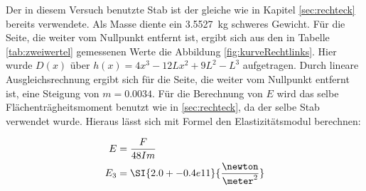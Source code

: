 Der in diesem Versuch benutzte Stab ist der gleiche wie in Kapitel \ref{sec:rechteck} bereits verwendete.
Als Masse diente ein \SI{3.5527}{\kilo\gram} schweres Gewicht. Für die Seite, die weiter vom Nullpunkt entfernt ist, ergibt
sich aus den in Tabelle \ref{tab:zweiwertel} gemessenen Werte
die Abbildung \ref{fig:kurveRechtlinks}. Hier wurde $D(x)$ über $h(x)=4x^3-12Lx^2+9L^2-L^3$ aufgetragen.
Durch lineare Ausgleichsrechnung ergibt sich für die Seite, die weiter vom Nullpunkt entfernt ist, eine Steigung von $m=\num{0.0034}$.
Für die Berechnung von $E$ wird das selbe Flächenträgheitsmoment benutzt wie in \ref{sec:rechteck}, da der selbe Stab verwendet wurde.
Hieraus lässt sich mit Formel den Elastizitätsmodul berechnen:

\begin{align*}
  E   &= \frac{F}{48Im} \\
  E_3 &= \SI{2.0+-0.4e11}{\frac{\newton}{\meter^2}} \\
\end{align*}

